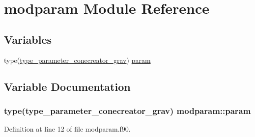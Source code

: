 \hypertarget{namespacemodparam}{}\section{modparam Module Reference}
\label{namespacemodparam}
\subsection*{Variables}
\begin{DoxyCompactItemize}
\item 
type(\hyperlink{structmodconstant_1_1type__parameter__conecreator__grav}{type\+\_\+parameter\+\_\+conecreator\+\_\+grav}) \hyperlink{namespacemodparam_a3cdea4d6103638af1f6ab9b4bd81bdd6}{param}
\end{DoxyCompactItemize}


\subsection{Variable Documentation}
\subsubsection[{\texorpdfstring{param}{param}}]{\setlength{\rightskip}{0pt plus 5cm}type({\bf type\+\_\+parameter\+\_\+conecreator\+\_\+grav}) modparam\+::param}\hypertarget{namespacemodparam_a3cdea4d6103638af1f6ab9b4bd81bdd6}{}\label{namespacemodparam_a3cdea4d6103638af1f6ab9b4bd81bdd6}


Definition at line 12 of file modparam.\+f90.

